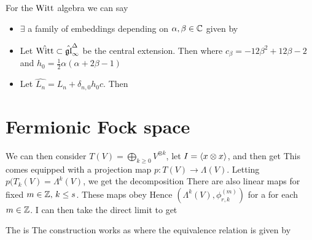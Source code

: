 \documentclass{article}
\begin{document}
\begin{prop}
For the $\operatorname{Witt}$ algebra we can say 
\begin{itemize}
    \item $\exists$ a family of embeddings depending on $\alpha,\beta \in \mathbb{C}$ given by 
    \item Let $\hat{\operatorname{Witt}} \subset \hat{\mathfrak{gl}}_\infty^\Delta$ be the central extension. Then 
    where $c_\beta = -12\beta^2 + 12\beta - 2$ and $h_0 = \frac{1}{2}\alpha(\alpha + 2\beta - 1)$
    \item Let $\hat{L_n} = L_n + \delta_{n,0}h_0 c$. Then 
\end{itemize}
\end{prop}

\section{Fermionic Fock space}

We can then consider $T(V) = \bigoplus_{k \geq 0} V^{\otimes k}$, let $I = \left\langle x \otimes x \right\rangle$, and then get 
This comes equipped with a projection map $p : T(V) \to \Lambda(V)$. Letting $p(T_k(V) = \Lambda^k(V)$, we get the decomposition
There are also linear maps 
for fixed $m \in \mathbb{Z}, \, k \leq s$. These maps obey 
Hence $(\Lambda^k(V),\phi_{r,k}^{(m)})$ for a  for each $m \in \mathbb{Z}$. I can then take the direct limit to get 
\begin{definition}
The  is 
The construction works as 
where the equivalence relation is given by 
\end{definition}
\end{document}
